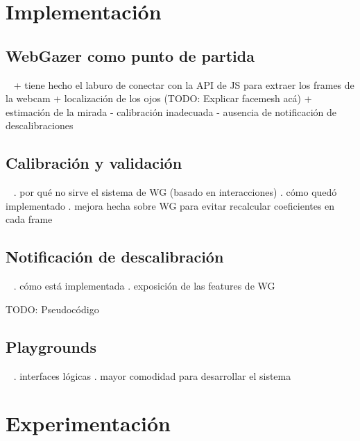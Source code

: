 \documentclass[aspectratio=169]{beamer}
\begin{document}
\section{Implementación}

\subsection{WebGazer como punto de partida}

\begin{frame}{~}
+ tiene hecho el laburo de conectar con la API de JS para extraer los frames de
  la webcam
  + localización de los ojos (TODO: Explicar facemesh acá)
+ estimación de la mirada
- calibración inadecuada
- ausencia de notificación de descalibraciones
\end{frame}

\subsection{Calibración y validación}

\begin{frame}{~}
. por qué no sirve el sistema de WG (basado en interacciones)
. cómo quedó implementado
. mejora hecha sobre WG para evitar recalcular coeficientes en cada frame
\end{frame}

\subsection{Notificación de descalibración}

\begin{frame}{~}
. cómo está implementada
. exposición de las features de WG

TODO: Pseudocódigo
\end{frame}

\subsection{Playgrounds}

\begin{frame}{~}
. interfaces lógicas
. mayor comodidad para desarrollar el sistema
\end{frame}

\section{Experimentación}
\end{document}
